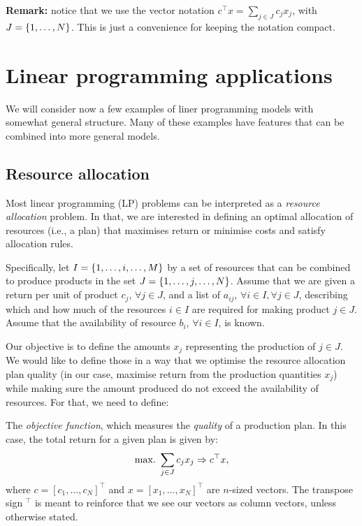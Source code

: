 {\bf Remark:} notice that we use the vector notation $c^\top x = \sum_{j \in J} c_j x_j$, with $J = \left\{ 1,\dots,N \right \}$. This is just a convenience for keeping the notation compact. 


\section{Linear programming applications}

We will consider now a few examples of liner programming models with somewhat general structure. Many of these examples have features that can be combined into more general models.


\subsection{Resource allocation} \label{section_121}

Most linear programming (LP) problems can be interpreted as a \emph{resource allocation} problem. In that, we are interested in defining an optimal allocation of resources (i.e., a plan) that maximises return or minimise costs and satisfy allocation rules. 

Specifically, let $I = \left\{ 1, \dots, i, \dots, M \right \}$ by a set of resources that can be combined to produce products in the set $J = \left\{ 1, \dots, j, \dots, N \right \}$. Assume that we are given a return per unit of product $c_j$, $\forall j\in J$, and a list of $a_{ij}$, $\forall i \in I, \forall j \in J$, describing which and how much of the resources $i \in I$ are required for making product $j \in J$. Assume that the availability of resource $b_i$, $\forall i\in I$, is known. 

Our objective is to define the amounts $x_j$ representing the production of $j \in J$. We would like to define those in a way that we optimise the resource allocation plan quality (in our case, maximise return from the production quantities $x_j$) while making sure the amount produced do not exceed the availability of resources. For that, we need to define: 

The \emph{objective function}, which measures the \emph{quality} of a production plan. In this case, the total return for a given plan is given by:
%
\begin{equation*}
	\mathop{\text{max.~}} \sum_{j \in J}c_jx_j \Rightarrow c^\top x,
\end{equation*}
%
where $c = [c_1, \dots, c_{N}]^\top$ and $x = [x_1, \dots, x_{N}]^\top$ are $n$-sized vectors. The transpose sign $^\top$ is meant to reinforce that we see our vectors as column vectors, unless otherwise stated.

